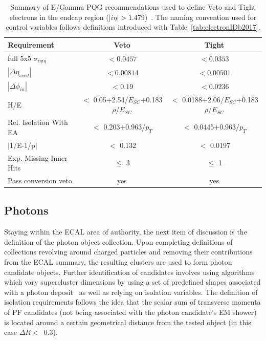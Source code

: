 \begin{table}[h]
\footnotesize
\centering
\begin{tabular}{|l|c|c|}
\hline\hline
Requirement    & Veto  & Tight             \\\hline
full 5x5 $\sigma_{i\eta i\eta}$ &  $< 0.0457$ &   $< 0.0353$    \\
$|\Delta\eta_{seed}|$ & $< 0.00814$ & $< 0.00501$ \\
$|\Delta\phi_{in}|$ & $< 0.19$ & $< 0.0236$ \\
H/E & $<$ 0.05+2.54/$E_{SC}$+0.183$\rho$/$E_{SC}$ & $<$ 0.0188+2.06/$E_{SC}$+0.183$\rho$/$E_{SC}$ \\
Rel. Isolation With EA & $<$ 0.203+0.963/$p_T$	& $<$ 0.0445+0.963/$p_T$\\
$|$1/E-1/p$|$ & $<$ 0.132	& $<$ 0.0197\\
Exp. Missing Inner Hits & $\leq$ 3&	 $\leq$ 1\\
Pass conversion veto & yes	& yes \\
\hline\hline
\end{tabular}
\caption{Summary of E/Gamma POG recommendations used to define Veto and Tight electrons in the endcap region ($|i\eta|> 1.479$)~\cite{twiki_egamma_1,twiki_egamma_2,note:AN_19_257}. The naming convention used for control variables follows definitions introduced with Table~\ref{tab:electronIDb2017}. }
\label{tab:electronIDe2017}
\end{table}
\subsection{Photons}
\label{subsec:photons}
\hspace{10pt} Staying within the ECAL area of authority, the next item of discussion is the definition of the photon object collection. Upon completing definitions of collections revolving around charged particles and removing their contributions from the ECAL summary, the resulting clusters are used to form photon candidate objects. Further identification of candidates involves using algorithms which vary supercluster dimensions by using a set of predefined shapes associated with a photon deposit~\cite{note:AN_19_257,paper_photon_1} as well as relying on isolation variables. The definition of isolation requirements follows the idea that the scalar sum of transverse momenta of PF candidates (not being associated with the photon candidate's EM shower) is located around a certain geometrical distance from the tested object (in this case $\Delta R<$~0.3).

